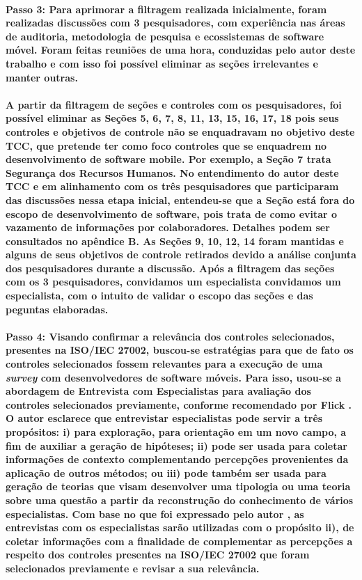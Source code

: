  \noindent 
    \paragraph{
    \textbf{Passo 3:} Para aprimorar a filtragem realizada inicialmente, foram realizadas discussões com 3 pesquisadores, com experiência nas áreas de auditoria, metodologia de pesquisa e ecossistemas de software móvel. Foram feitas reuniões de uma hora, conduzidas pelo autor deste trabalho e com isso foi possível eliminar as seções irrelevantes e manter outras.
    }
 
    \paragraph{
  A partir da filtragem de seções e controles com os pesquisadores, foi possível eliminar as Seções 5, 6, 7, 8, 11, 13, 15, 16, 17, 18 pois seus controles e objetivos de controle não se enquadravam no objetivo deste TCC, que  pretende ter como foco controles que se enquadrem no desenvolvimento de software mobile. Por exemplo, a Seção 7 trata Segurança dos Recursos Humanos. No entendimento do autor deste TCC e em alinhamento com os três pesquisadores que participaram das discussões nessa etapa inicial, entendeu-se que a Seção está fora do escopo de desenvolvimento de software, pois trata de como evitar o vazamento de informações por colaboradores. Detalhes podem ser consultados no apêndice B. As Seções 9, 10, 12, 14 foram mantidas e alguns de seus objetivos de controle retirados devido a análise conjunta dos pesquisadores durante a discussão. Após a filtragem das seções com os 3 pesquisadores, convidamos um especialista convidamos um especialista, com o intuito de validar o escopo das seções e das peguntas elaboradas. 
    }
    
  \noindent
    \paragraph{
    \textbf{Passo 4:} Visando confirmar a relevância dos controles selecionados, presentes na ISO/IEC 27002, buscou-se estratégias para que de fato os controles selecionados fossem relevantes para a execução de uma \textit{survey} com desenvolvedores de software móveis. Para isso, usou-se a abordagem de Entrevista com Especialistas para avaliação dos controles selecionados previamente, conforme recomendado por Flick \cite{flick2018introduction}. O autor esclarece que entrevistar especialistas pode servir a três propósitos: i) para exploração, para orientação em um novo campo, a fim de auxiliar a geração de hipóteses; ii) pode ser usada para coletar informações de contexto complementando percepções provenientes da aplicação de outros métodos; ou iii) pode também ser usada para geração de teorias que visam desenvolver uma tipologia ou uma teoria sobre uma questão a partir da reconstrução do conhecimento de vários especialistas. Com base no que foi expressado pelo autor \cite{flick2018introduction}, as entrevistas com os especialistas sarão utilizadas com o propósito ii), de coletar informações com a finalidade de complementar as percepções a respeito dos controles presentes na ISO/IEC 27002 que foram selecionados previamente e revisar a sua relevância.
    }
    
